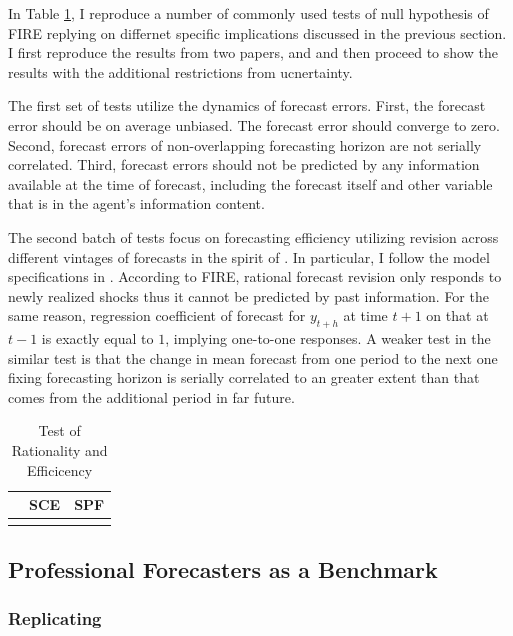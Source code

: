 \documentclass[]{article}
\begin{document}
In Table \ref{NullTestTable}, I reproduce a number of commonly used tests of null hypothesis of FIRE replying on differnet specific implications discussed in the previous section. I first reproduce the results from two papers, \cite{mankiw2003disagreement} and \cite{fuhrer2018intrinsic} and then proceed to show the results with the additional restrictions from ucnertainty. 

The first set of tests utilize the dynamics of forecast errors. First, the forecast error should be on average unbiased. The forecast error should converge to zero. Second, forecast errors of non-overlapping forecasting horizon are not serially correlated.  Third, forecast errors should not be predicted by any information available at the time of forecast, including the forecast itself and other variable that is in the agent's information content. 

The second batch of tests focus on  forecasting efficiency utilizing revision across different vintages of forecasts in the spirit of \cite{nordhaus1987forecasting}. In particular, I follow the model specifications in \cite{fuhrer2018intrinsic}. According to FIRE, rational forecast revision only responds to newly realized shocks thus it cannot be predicted by past information. For the same reason, regression coefficient of forecast for $y_{t+h}$  at time $t+1$ on that at $t-1$ is exactly equal to $1$, implying one-to-one responses.  A weaker test in the similar test is that the change in mean forecast from one period to the next one fixing forecasting horizon is serially correlated to an greater extent than that comes from the additional period in far future. 

\begin{table}[]\label{NullTestTable}
	\caption{Test of Rationality and Efficicency}
	\centering 
	\begin{tabular}{lll}
		
		\hline 
		& SCE & SPF        \\
		\hline 
		                                  &                             &             \\
	\end{tabular}
\end{table}


\subsection{Professional Forecasters as a Benchmark}

\subsubsection{Replicating \cite{coibion2012can}}
\end{document}
